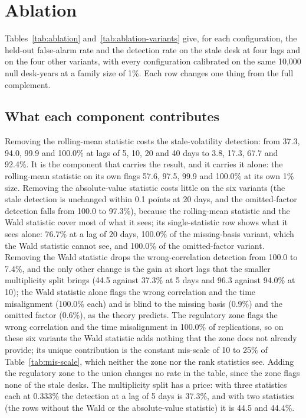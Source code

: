 \section{Ablation}
\label{sec:ablation}

Tables~\ref{tab:ablation} and~\ref{tab:ablation-variants} give, for each configuration, the held-out false-alarm rate and the detection rate on the stale desk at four lags and on the four other variants, with every configuration calibrated on the same 10,000 null desk-years at a family size of 1\%.
Each row changes one thing from the full complement.




\subsection{What each component contributes}
\label{sec:ablation-components}

Removing the rolling-mean statistic costs the stale-volatility detection: from 37.3, 94.0, 99.9 and 100.0\% at lags of 5, 10, 20 and 40 days to 3.8, 17.3, 67.7 and 92.4\%.
It is the component that carries the result, and it carries it alone: the rolling-mean statistic on its own flags 57.6, 97.5, 99.9 and 100.0\% at its own 1\% size.
Removing the absolute-value statistic costs little on the six variants (the stale detection is unchanged within 0.1 points at 20 days, and the omitted-factor detection falls from 100.0 to 97.3\%), because the rolling-mean statistic and the Wald statistic cover most of what it sees; its single-statistic row shows what it sees alone: 76.7\% at a lag of 20 days, 100.0\% of the missing-basis variant, which the Wald statistic cannot see, and 100.0\% of the omitted-factor variant.
Removing the Wald statistic drops the wrong-correlation detection from 100.0 to 7.4\%, and the only other change is the gain at short lags that the smaller multiplicity split brings (44.5 against 37.3\% at 5 days and 96.3 against 94.0\% at 10); the Wald statistic alone flags the wrong correlation and the time misalignment (100.0\% each) and is blind to the missing basis (0.9\%) and the omitted factor (0.6\%), as the theory predicts.
The regulatory zone flags the wrong correlation and the time misalignment in 100.0\% of replications, so on these six variants the Wald statistic adds nothing that the zone does not already provide; its unique contribution is the constant mis-scale of 10 to 25\% of Table~\ref{tab:mis-scale}, which neither the zone nor the rank statistics see.
Adding the regulatory zone to the union changes no rate in the table, since the zone flags none of the stale desks.
The multiplicity split has a price: with three statistics each at 0.333\% the detection at a lag of 5 days is 37.3\%, and with two statistics (the rows without the Wald or the absolute-value statistic) it is 44.5 and 44.4\%.

